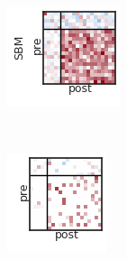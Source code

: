 \begin{figure}[t!]
\begin{subfigure}[b]{1.10in}
  \end{subfigure}
  \\
  \vspace{-.1in}
  \begin{subfigure}[b]{1.25in}
    \centering
    \includegraphics[width=\textwidth]{figures/ch3/Dense-SBM.png}
  \end{subfigure}
  ~
  \hspace{-.1in}
  \begin{subfigure}[b]{1.10in}
    \centering
    \includegraphics[width=\textwidth]{figures/ch3/Bernoulli-SBM.png}

\end{subfigure}
\end{figure}
